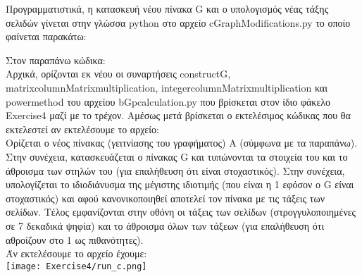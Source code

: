 \documentclass[a4paper,11pt]{article}
\newcommand{\lt}{\latintext}
\newcommand{\gt}{\greektext}
\begin{document}
Προγραμματιστικά, η κατασκευή νέου πίνακα {\lt G} και ο υπολογισμός νέας τάξης σελιδών γίνεται στην γλώσσα {\lt python} στο αρχείο {\lt c\textunderscore Graph\textunderscore Modifications.py} το οποίο φαίνεται παρακάτω:\\

\lt

\gt

Στον παραπάνω κώδικα:\\
Αρχικά, ορίζονται εκ νέου οι  συναρτήσεις {\lt construct\textunderscore G}, {\lt matrix\textunderscore columnMatrix\textunderscore multiplication}, {\lt integer\textunderscore columnMatrix\textunderscore multiplication} και {\lt power\textunderscore method} του αρχείου {\lt b\textunderscore G\textunderscore p\textunderscore calculation.py} που βρίσκεται στον ίδιο φάκελο {\lt Exercise4} μαζί με το τρέχον.
Αμέσως μετά βρίσκεται ο εκτελέσιμος κώδικας που θα εκτελεστεί αν εκτελέσουμε το αρχείο:\\
Ορίζεται ο νέος πίνακας (γειτνίασης του γραφήματος) Α (σύμφωνα με τα παραπάνω). Στην συνέχεια, κατασκευάζεται ο πίνακας {\lt G} και τυπώνονται τα στοιχεία του και το άθροισμα των στηλών του (για επαλήθευση ότι είναι στοχαστικός). Στην συνέχεια, υπολογίζεται το ιδιοδιάνυσμα της μέγιστης ιδιοτιμής (που είναι η 1 εφόσον ο {\lt G} είναι στοχαστικός) και αφού κανονικοποιηθεί αποτελεί τον πίνακα με τις τάξεις των σελίδων. Τέλος εμφανίζονται στην οθόνη οι τάξεις των σελίδων (στρογγυλοποιημένες σε 7 δεκαδικά ψηφία) και το άθροισμα όλων των τάξεων (για επαλήθευση ότι αθροίζουν στο 1 ως πιθανότητες).\\

Άν εκτελέσουμε το αρχείο έχουμε:\\
\texttt{[image: Exercise4/run\_c.png]}\\
\end{document}
